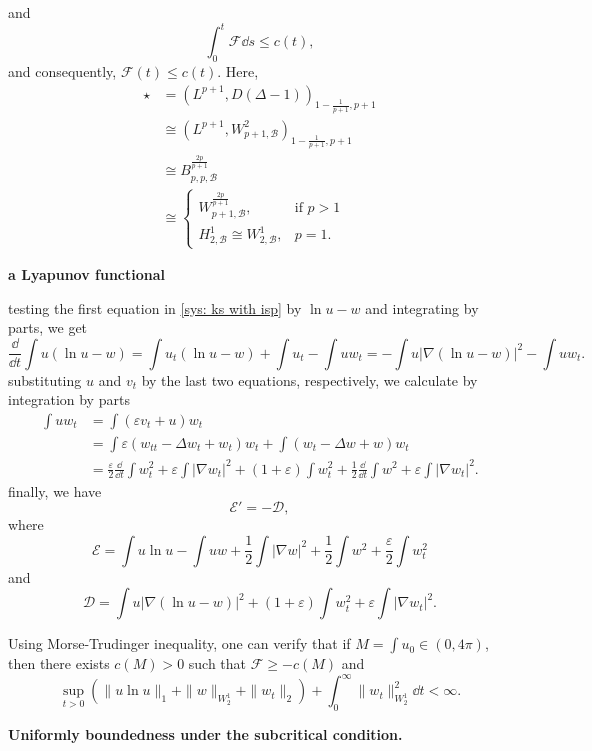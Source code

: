 and 
\[
    \int_0^t\mathcal{F}\dd s\leq c(t),
\]
and consequently, \(\mathcal{F}(t)\leq c(t)\).
Here,
\begin{align*}
  \star &= (L^{p+1},D(\Delta-1))_{1-\frac{1}{p+1},p+1}\\
  &\cong (L^{p+1}, W^2_{p+1,\mathcal{B}})_{1-\frac{1}{p+1},p+1}\\
  &\cong B_{p,p,\mathcal{B}}^{\frac{2p}{p+1}}\\
  &\cong\begin{cases}
          W^{\frac{2p}{p+1}}_{p+1,\mathcal{B}}, & \mbox{if } p>1 \\
          H^1_{2,\mathcal{B}}\cong W^1_{2,\mathcal{B}}, & p=1.
        \end{cases}
\end{align*}

\textbf{a Lyapunov functional}

testing the first equation in \eqref{sys: ks with isp} by $\ln u -w$ and integrating by parts, we get
\[
    \frac{\dd}{\dd t}\int u(\ln u - w)
    = \int u_t(\ln u - w) + \int u_t - \int uw_t
    = -\int u|\nabla (\ln u - w)|^2 - \int uw_t.
\]
substituting $u$ and $v_t$ by the last two equations, respectively, we calculate by integration by parts
\begin{align*}
    \int uw_t &= \int (\varepsilon v_t + u)w_t\\
    &= \int \varepsilon(w_{tt} - \Delta w_t + w_t)w_t 
    + \int (w_t - \Delta w + w)w_t\\
    &= \frac{\varepsilon}{2}\frac{\dd}{\dd t}\int w_t^2 
    + \varepsilon\int |\nabla w_t|^2
    + (1+\varepsilon) \int w_t^2
    + \frac{1}{2}\frac{\dd}{\dd t}\int w^2
    + \varepsilon\int |\nabla w_t|^2.
\end{align*}
finally, we have 
\[
    \mathcal{E}' = -\mathcal{D},
\]
where
\[
    \mathcal{E} = \int u\ln u - \int uw + \frac{1}{2}\int |\nabla w|^2 
    + \frac12\int w^2 + \frac{\varepsilon}{2}\int w_t^2
\]
and 
\[
    \mathcal{D} = \int u|\nabla(\ln u - w)|^2 + (1 + \varepsilon)\int w_t^2 
    + \varepsilon\int |\nabla w_t|^2.
\]

Using Morse-Trudinger inequality, one can verify that if $M=\int u_0\in(0,4\pi)$, then there exists $c(M)>0$ such that \(\mathcal{F}\geq -c(M)\) and
\[
    \sup_{t>0}(\|u\ln u\|_1 + \|w\|_{W^1_2} + \|w_t\|_2) + \int_0^\infty\|w_t\|_{W^1_2}^2\dd t < \infty.
\]

\textbf{Uniformly boundedness under the subcritical condition.}

